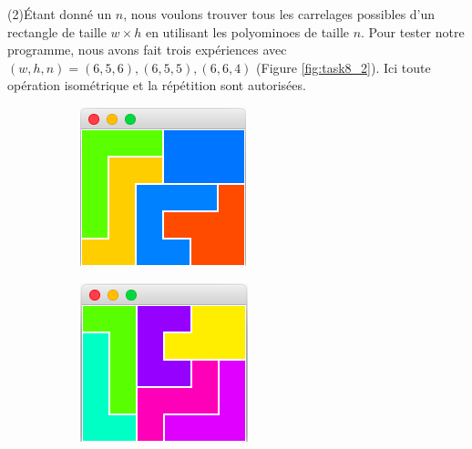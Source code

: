 \documentclass[a4paper,12pt]{article}
\begin{document}
\bigskip
\noindent (2)Étant donné un $n$, nous voulons trouver tous les carrelages possibles d'un rectangle de taille $w \times h$ en utilisant les polyominoes de taille $n$. Pour tester notre programme, nous avons fait trois expériences avec $(w, h, n)=(6,5,6), (6,5,5), (6,6,4)$ (Figure \ref{fig:task8_2}). Ici toute opération isométrique et la répétition sont autorisées.
\begin{figure}[h!]
	\centering
	\begin{subfigure}[h]{0.3\textwidth}
		\includegraphics[width=\textwidth]{figures/656.png}
		\caption{}
	\end{subfigure}
	\hspace{0.03\textwidth}
	\begin{subfigure}[h]{0.3\textwidth}
		\includegraphics[width=\textwidth]{figures/655.png}

\end{subfigure}
\end{figure}
\end{document}
